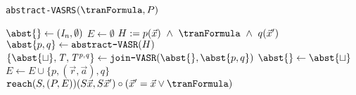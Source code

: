 
	\begin{algorithm}[H]
		\caption{\texttt{abstract-VASRS}$(\tranFormula, P)$}\label{euclid}
		\begin{algorithmic}[1]
			\State $\abst{} \gets (\mathit{I_n}, \emptyset)$
			\State $E \gets \emptyset$
					\State $H := p(\vec{x})\ \land\  \tranFormula\ \land \ q(\vec{x}')$
					\State $\abst{p, q} \gets \texttt{abstract-VASR}(H)$
				\EndFor
			\EndFor
				\State $\{ \abst{\sqcup}, \mathit{T, T^{p,q}} \} \gets \texttt{join-VASR}(\abst{}, \abst{p, q})$
				\State $\abst{} \gets \abst{\sqcup}$
					\State $E \gets E \cup \{p, (\vec{r}, \vec{a}), q\}$
				\EndFor
			\EndFor \\ 
			\Return $\texttt{reach}(S,(P, E))(S\vec{x}, S\vec{x}') \circ (\vec{x}' = \vec{x} \lor \tranFormula)$
		\end{algorithmic}
	\end{algorithm}